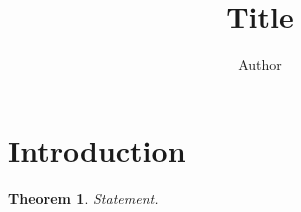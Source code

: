 \documentclass[11pt]{article}
\title{Title}
\author{Author}
\newtheorem{theorem}{Theorem}
\theoremstyle{remark}\newtheorem*{remark}{Remark}
\begin{document}
\maketitle

\section{Introduction}

\begin{theorem}
Statement.
\end{theorem}
\end{document}
